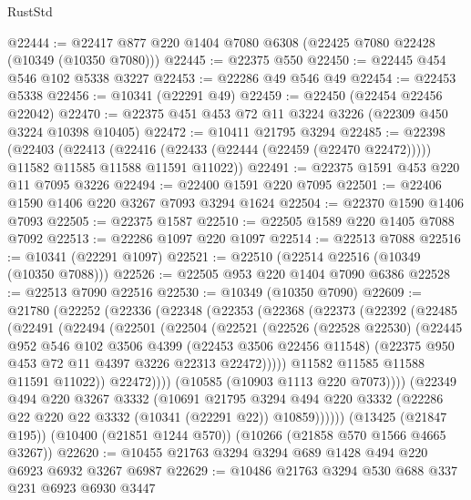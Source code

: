 \begin{lexlean}{RustStd}
\begin{coremodule}
{\begin{coremodule}
{{{{{{{{{{{{{{{{{{{{{{{{{@22444 := @22417 @877 @220 @1404 @7080 @6308 (@22425 @7080 @22428 (@10349 (@10350 @7080)))
@22445 := @22375 @550
@22450 := @22445 @454 @546 @102 @5338 @3227
@22453 := @22286 @49 @546 @49
@22454 := @22453 @5338
@22456 := @10341 (@22291 @49)
@22459 := @22450 (@22454 @22456 @22042)
@22470 := @22375 @451 @453 @72 @11 @3224 @3226 (@22309 @450 @3224 @10398 @10405)
@22472 := @10411 @21795 @3294
@22485 := @22398
    (@22403
      (@22413
        (@22416 (@22433 (@22444 (@22459 (@22470 @22472)))))
        @11582
        @11585
        @11588
        @11591
        @11022))
@22491 := @22375 @1591 @453 @220 @11 @7095 @3226
@22494 := @22400 @1591 @220 @7095
@22501 := @22406 @1590 @1406 @220 @3267 @7093 @3294 @1624
@22504 := @22370 @1590 @1406 @7093
@22505 := @22375 @1587
@22510 := @22505 @1589 @220 @1405 @7088 @7092
@22513 := @22286 @1097 @220 @1097
@22514 := @22513 @7088
@22516 := @10341 (@22291 @1097)
@22521 := @22510 (@22514 @22516 (@10349 (@10350 @7088)))
@22526 := @22505 @953 @220 @1404 @7090 @6386
@22528 := @22513 @7090 @22516
@22530 := @10349 (@10350 @7090)
@22609 := @21780
    (@22252
      (@22336
        (@22348
          (@22353
            (@22368
              (@22373
                (@22392
                  (@22485
                    (@22491
                      (@22494
                        (@22501
                          (@22504
                            (@22521
                              (@22526
                                (@22528 @22530)
                                (@22445
                                  @952
                                  @546
                                  @102
                                  @3506
                                  @4399
                                  (@22453 @3506 @22456 @11548)
                                  (@22375 @950 @453 @72 @11 @4397 @3226 @22313 @22472)))))
                          @11582
                          @11585
                          @11588
                          @11591
                          @11022))
                      @22472))))
              (@10585 (@10903 @1113 @220 @7073))))
          (@22349
            @494
            @220
            @3267
            @3332
            (@10691
              @21795
              @3294
              @494
              @220
              @3332
              (@22286 @22 @220 @22 @3332 (@10341 (@22291 @22)) @10859))))))
    (@13425 (@21847 @195))
    (@10400 (@21851 @1244 @570))
    (@10266 (@21858 @570 @1566 @4665 @3267))
@22620 := @10455 @21763 @3294 @3294 @689 @1428 @494 @220 @6923 @6932 @3267 @6987
@22629 := @10486 @21763 @3294 @530 @688 @337 @231 @6923 @6930 @3447
}}}}}}}}}}}}}}}}}}}}}}}}}
\end{coremodule}}
\end{coremodule}
\end{lexlean}
